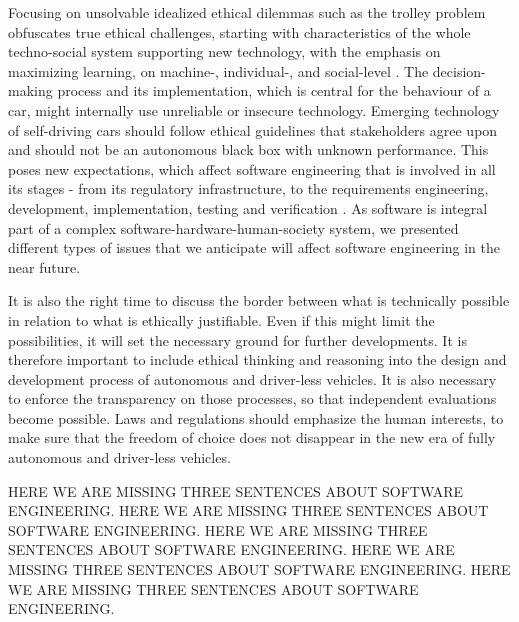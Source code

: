 Focusing on unsolvable idealized ethical dilemmas such as the trolley problem obfuscates true ethical challenges, starting with characteristics of the whole techno-social system supporting new technology, with the emphasis on maximizing learning, on machine-, individual-, and social-level \cite{DodigCrnkovic2012, DBLP:journals/corr/CharisiDFLMSSWY17}. The decision-making process and its implementation, which is central for the behaviour of a car, might internally use unreliable or insecure technology. Emerging technology of self-driving cars should follow ethical guidelines that stakeholders agree upon and should not be an autonomous black box with unknown performance. This poses new expectations, which affect software engineering that is involved in all its stages - from its regulatory infrastructure, to the requirements engineering, development, implementation, testing and verification \cite{Greene2016_1514,MoralMachine2016,Mooney2016,Ackerman2016,DBLP:journals/corr/CharisiDFLMSSWY17}. As software is integral part of a complex software-hardware-human-society system, we presented different types of issues that we anticipate will affect software engineering in the near future.

It is also the right time to discuss the border between what is technically possible in relation to what is ethically justifiable. Even if this might limit the possibilities, it will set the necessary ground for further developments. It is therefore important to include ethical thinking and reasoning into the design and development process of autonomous and driver-less vehicles. It is also necessary to enforce the transparency on those processes, so that independent evaluations become possible. Laws and regulations should emphasize the human interests, to make sure that the freedom of choice does not disappear in the new era of fully autonomous and driver-less vehicles. 

 HERE WE ARE MISSING THREE SENTENCES ABOUT SOFTWARE ENGINEERING. 
 HERE WE ARE MISSING THREE SENTENCES ABOUT SOFTWARE ENGINEERING. 
 HERE WE ARE MISSING THREE SENTENCES ABOUT SOFTWARE ENGINEERING. 
 HERE WE ARE MISSING THREE SENTENCES ABOUT SOFTWARE ENGINEERING. 
 HERE WE ARE MISSING THREE SENTENCES ABOUT SOFTWARE ENGINEERING. 
 



